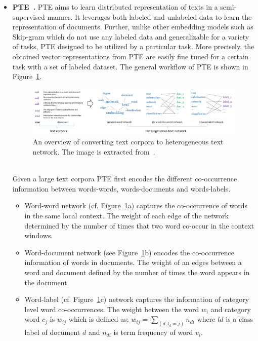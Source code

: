 \begin{itemize}
\item \textbf{PTE~\cite{PTE}.} PTE aims to learn distributed representation of texts in a semi-supervised manner. It leverages both labeled and unlabeled data to learn the representation of documents. Further, unlike other embedding models such as Skip-gram which do not use any labeled data and generalizable for a variety of tasks, PTE designed to be utilized by a particular task.  More precisely, the obtained vector representations from PTE are easily fine tuned for a certain task with a set of labeled dataset. The general workflow of PTE is shown in Figure~\ref{fig:PTE}.\\
\vspace{0.1cm}
\begin{figure}[h]
 \includegraphics[width=\linewidth]{Figures/fig_PTE.png}
 \caption{An overview of converting text corpora to heterogeneous text network. The image is extracted from~\protect\cite{PTE}.}
 \label{fig:PTE}
\end{figure} \\
Given a large text corpora PTE first encodes the different co-occurrence information  between words-words, words-documents and words-labels. 
\begin{itemize}
  \item Word-word network (cf. Figure~\ref{fig:PTE}a) captures the co-occurrence of words in the same local context. The weight of each edge of the network determined by the number of times that two word co-occur in the context windows.\\
  
  \item Word-document network (see Figure~\ref{fig:PTE}b) encodes the co-occurrence information of words in documents. The weight of an edges between a word and document defined by the number of times the word appears in the document. \\
  
  \item Word-label (cf. Figure~\ref{fig:PTE}c) network captures the information of category level word co-occurrences. The weight between the word $w_{i}$ and category word $c_{j}$ is $w_{ij}$ which is defined as: $w_{ij} = \sum_{(d:l_{d}=j)} {n_{di}}$ where $l{d}$ is a class label of document $d$ and $n_{di}$ is term frequency of word $v_{i}$. \\
  

\end{itemize}
\end{itemize}
